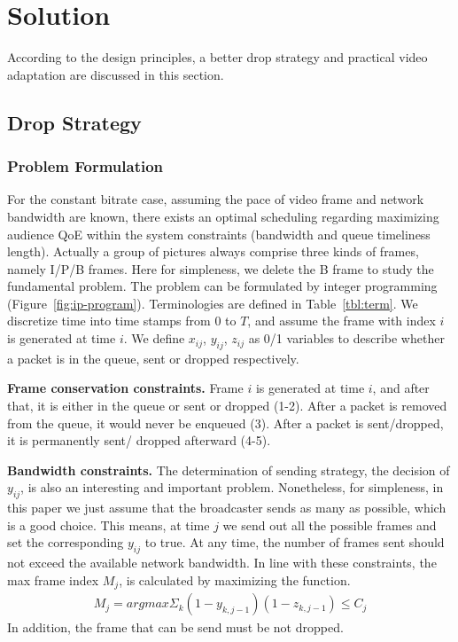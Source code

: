 \newcommand{\Mod}[1]{\text{ (mod } #1\text{)}}
\section{Solution}
According to the design principles, a better drop strategy and practical video adaptation are discussed in this section.
\subsection{Drop Strategy}
\subsubsection{Problem Formulation}


For the constant bitrate case, assuming the pace of video frame and network bandwidth are known, there exists an optimal scheduling regarding maximizing audience QoE within the system constraints (bandwidth and queue timeliness length). Actually a group of pictures always comprise three kinds of frames, namely I/P/B frames. Here for simpleness, we delete the B frame to study the fundamental problem. The problem can be formulated by integer programming (Figure~\ref{fig:ip-program}). Terminologies are defined in Table~\ref{tbl:term}. We discretize time into time stamps from $0$ to $T$, and assume the frame with index $i$ is generated at time $i$. We define $x_{ij}$, $y_{ij}$, $z_{ij}$ as 0/1 variables to describe whether a packet is in the queue, sent or dropped respectively.

\textbf{Frame conservation constraints.}
Frame $i$ is generated at time $i$, and after that, it is either in the queue or sent or dropped (1-2).
After a packet is removed from the queue, it would never be enqueued (3).
After a packet is sent/dropped, it is permanently sent/ dropped afterward (4-5).

\textbf{Bandwidth constraints.}
The determination of sending strategy, the decision of $y_{ij}$, is also an interesting and important problem. Nonetheless, for simpleness, in this paper we just assume that the broadcaster sends as many as possible, which is a good choice. This means, at time $j$ we send out all the possible frames and set the corresponding $y_{ij}$ to true. At any time, the number of frames sent should not exceed the available network bandwidth. In line with these constraints, the max frame index $M_{j}$, is calculated by maximizing the function.
\begin{align}
M_j = argmax \Sigma_k (1-y_{k,j-1})(1-z_{k,j-1}) \leq C_{j}
\end{align}
In addition, the frame that can be send must be not dropped.


